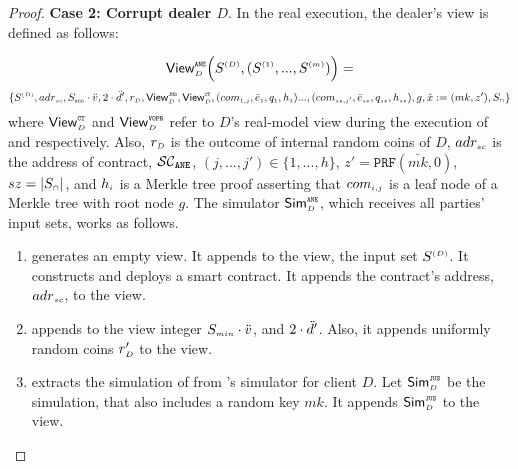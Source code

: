 \begin{proof}
\noindent\textbf{Case 2: Corrupt dealer $D$}.  In the real execution, the dealer's view is defined as follows: 


$$ \mathsf{View}_{\scriptscriptstyle D}^{\scriptscriptstyle \mathtt{ANE}} \Big(S^{\scriptscriptstyle (D)}, (S^{\scriptscriptstyle (1)},..., S^{\scriptscriptstyle (m)})\Big)=$$ $$ \{S^{\st (D)}, adr_{\st sc}, S_{\minn}\cdot \vc, 2\cdot \dc', 
%
%
 r_{\st D},  \mathsf{View}^{\st \fpsi}_{\st D}, \mathsf{View}^{\st \ct}_{\st D}, (com_{\st 1,j}, \bar{e}_{\st 1}, q_{\st 1}, h_{\st 1})..., (com_{\st sz, j'}, \bar{e}_{\st sz}, q_{\st {sz}}, h_{\st sz}), g, \hat{x}:=({mk}, z'), 
  S_{\st \cap}\}$$
%
where  $\mathsf{View}^{\scriptscriptstyle \mathtt{CT}}_{\scriptscriptstyle D}$ and $\mathsf{View}^{\scriptscriptstyle \mathtt{VOPR}}_{\scriptscriptstyle D}$ refer to $D$'s real-model view during the execution of \ct and \vopr respectively. Also, $r_{\scriptscriptstyle D}$ is the outcome of internal random coins of $D$, $adr_{\scriptscriptstyle sc}$ is the address of contract, $\mathcal{SC}_{\mathtt{ANE}}$, $(j, ...,j')\in \{1,..., h\}$, $z'=\mathtt{PRF}(\bar{mk}, 0)$, $sz=|S_{\scriptscriptstyle \cap}|$, and $h_{\scriptscriptstyle i}$ is a Merkle tree proof asserting that $com_{\scriptscriptstyle i,j}$ is a leaf node of a Merkle tree with root node $g$. The simulator $\mathsf{Sim}^{\scriptscriptstyle \mathtt{ANE}}_{\scriptscriptstyle D}$, which receives all parties' input sets, works as follows. 

\begin{enumerate}

%
\item generates an empty view. It appends to the view, the input set $S^{\scriptscriptstyle (D)}$. It constructs and deploys a smart contract. It appends the contract's address, $ {adr}_{\scriptscriptstyle sc}$, to the view. 


\item appends to the view integer $S_{\scriptscriptstyle min}\cdot \ddot{v}$, and $2\cdot \ddot{d}'$. Also, it appends uniformly random coins $r'_{\scriptscriptstyle D}$ to the view. 

%
\item extracts the simulation of \fpsi from \fpsi's simulator for client $D$. Let $\mathsf{Sim}^{\scriptscriptstyle \mathtt{JUS}}_{\scriptscriptstyle D}$ be the simulation, that also includes a random key $mk$. It appends $\mathsf{Sim}^{\scriptscriptstyle \mathtt{JUS}}_{\scriptscriptstyle D}$ to the view. 



\end{enumerate}
\end{proof}
